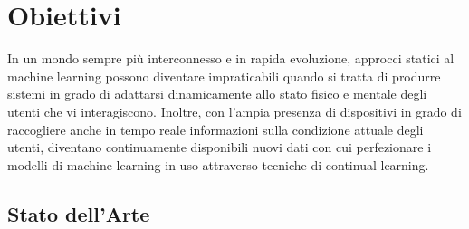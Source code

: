 \chapter{Obiettivi}
In un mondo sempre più interconnesso e in rapida evoluzione, approcci statici al machine learning possono diventare impraticabili quando si tratta di produrre sistemi in grado di adattarsi dinamicamente allo stato fisico e mentale degli utenti che vi interagiscono. Inoltre, con l'ampia presenza di dispositivi in grado di raccogliere anche in tempo reale informazioni sulla condizione attuale degli utenti, diventano continuamente disponibili nuovi dati con cui perfezionare i modelli di machine learning in uso attraverso tecniche di continual learning.
\section{Stato dell'Arte}
